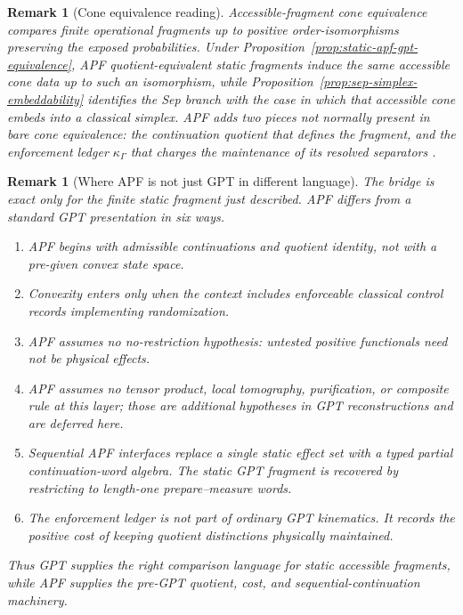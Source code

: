 \documentclass[11pt]{article}
\newtheorem{remark}[theorem]{Remark}
\begin{document}
\begin{remark}[Cone equivalence reading]
Accessible-fragment cone equivalence compares finite operational fragments up to positive order-isomorphisms preserving the exposed probabilities.  Under Proposition~\ref{prop:static-apf-gpt-equivalence}, APF quotient-equivalent static fragments induce the same accessible cone data up to such an isomorphism, while Proposition~\ref{prop:sep-simplex-embeddability} identifies the Sep branch with the case in which that accessible cone embeds into a classical simplex.  APF adds two pieces not normally present in bare cone equivalence: the continuation quotient that defines the fragment, and the enforcement ledger \(\kappa_\Gamma\) that charges the maintenance of its resolved separators \cite{SelbySchmidWolfeSainzKunjwalSpekkens2023}.
\end{remark}

\begin{remark}[Where APF is not just GPT in different language]\label{rem:apf-not-just-gpt}
The bridge is exact only for the finite static fragment just described.  APF differs from a standard GPT presentation in six ways.
\begin{enumerate}[label=(\alph*)]
\item APF begins with admissible continuations and quotient identity, not with a pre-given convex state space.
\item Convexity enters only when the context includes enforceable classical control records implementing randomization.
\item APF assumes no no-restriction hypothesis: untested positive functionals need not be physical effects.
\item APF assumes no tensor product, local tomography, purification, or composite rule at this layer; those are additional hypotheses in GPT reconstructions and are deferred here.
\item Sequential APF interfaces replace a single static effect set with a typed partial continuation-word algebra.  The static GPT fragment is recovered by restricting to length-one prepare--measure words.
\item The enforcement ledger is not part of ordinary GPT kinematics.  It records the positive cost of keeping quotient distinctions physically maintained.
\end{enumerate}
Thus GPT supplies the right comparison language for static accessible fragments, while APF supplies the pre-GPT quotient, cost, and sequential-continuation machinery.
\end{remark}
\end{document}
